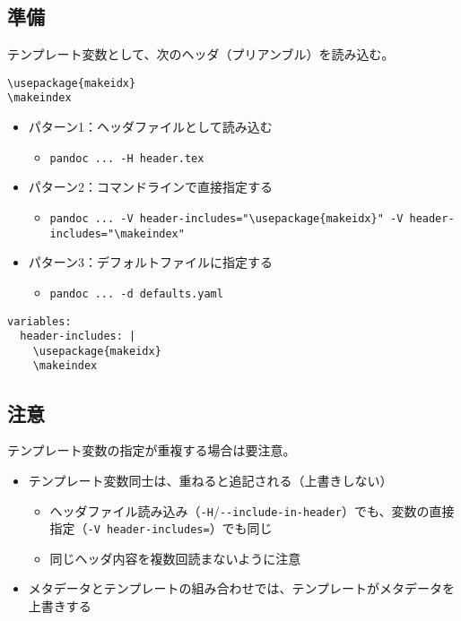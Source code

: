 \documentclass[
  a4paper,
  lualatex,
  ja=standard]{bxjsarticle}
\author{}
\date{}
\providecommand{\tightlist}{%
  \setlength{\itemsep}{0pt}\setlength{\parskip}{0pt}}
\begin{document}
\hypertarget{ux6e96ux5099}{%
\subsection{準備}\label{ux6e96ux5099}}

テンプレート変数として、次のヘッダ（プリアンブル）を読み込む。

\begin{verbatim}
\usepackage{makeidx}
\makeindex
\end{verbatim}

\begin{itemize}
\tightlist
\item
  パターン1：ヘッダファイルとして読み込む

  \begin{itemize}
  \tightlist
  \item
    \texttt{pandoc\ ...\ -H\ header.tex}
  \end{itemize}
\item
  パターン2：コマンドラインで直接指定する

  \begin{itemize}
  \tightlist
  \item
    \texttt{pandoc\ ...\ -V\ header-includes="\textbackslash{}usepackage\{makeidx\}"\ -V\ header-includes="\textbackslash{}makeindex"}
  \end{itemize}
\item
  パターン3：デフォルトファイルに指定する

  \begin{itemize}
  \tightlist
  \item
    \texttt{pandoc\ ...\ -d\ defaults.yaml}
  \end{itemize}
\end{itemize}

\begin{verbatim}
variables:
  header-includes: |
    \usepackage{makeidx}
    \makeindex
\end{verbatim}

\hypertarget{ux6ce8ux610f}{%
\subsection{注意}\label{ux6ce8ux610f}}

テンプレート変数の指定が重複する場合は要注意。

\begin{itemize}
\tightlist
\item
  テンプレート変数同士は、重ねると追記される（上書きしない）

  \begin{itemize}
  \tightlist
  \item
    ヘッダファイル読み込み（\texttt{-H}/\texttt{-\/-include-in-header}）でも、変数の直接指定（\texttt{-V\ header-includes=}）でも同じ
  \item
    同じヘッダ内容を複数回読まないように注意
  \end{itemize}
\item
  メタデータとテンプレートの組み合わせでは、テンプレートがメタデータを上書きする
\end{itemize}
\end{document}
